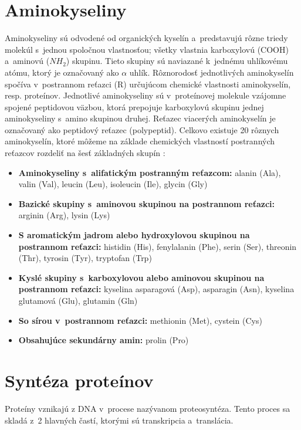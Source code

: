 \section{Aminokyseliny}
Aminokyseliny sú odvodené od organických kyselín a~predstavujú rôzne triedy molekúl s~jednou spoločnou vlastnosťou; všetky vlastnia karboxylovú (COOH) a~aminovú ($NH_{2}$) skupinu. Tieto skupiny sú naviazané k~jednému uhlíkovému atómu, ktorý je označovaný ako $\alpha$ uhlík. Rôznorodosť jednotlivých aminokyselín spočíva v~postrannom reťazci (R) určujúcom chemické vlastnosti aminokyselín, resp. proteínov. Jednotlivé aminokyseliny sú v~proteínovej molekule vzájomne spojené peptidovou väzbou, ktorá prepojuje karboxylovú skupinu jednej aminokyseliny s~amino skupinou druhej. Reťazec viacerých aminokyselín je označovaný ako peptidový reťazec (polypeptid). 
Celkovo existuje 20 rôznych aminokyselín, ktoré môžeme na základe chemických vlastností postranných reťazcov rozdeliť na šesť základných skupín \cite{aminokyseliny}:

\begin{itemize}
	\item \textbf{Aminokyseliny s~alifatickým postranným reťazcom:} alanin (Ala), valin (Val), leucin (Leu), isoleucin (Ile), glycin (Gly)
	\item \textbf{Bazické skupiny s~aminovou skupinou na postrannom reťazci:} arginin (Arg), lysin (Lys)
	\item \textbf{S aromatickým jadrom alebo hydroxylovou skupinou na postrannom reťazci:}
	histidin (His), fenylalanin (Phe), serin (Ser), threonin (Thr), tyrosin (Tyr), tryptofan (Trp)
	\item \textbf{Kyslé skupiny s~karboxylovou alebo aminovou skupinou na postrannom reťazci:} kyselina asparagová (Asp), asparagin (Asn), kyselina glutamová (Glu), glutamin (Gln)
	\item \textbf{So sírou v~postrannom reťazci:} methionin (Met), cystein (Cys)
	\item \textbf{Obsahujúce sekundárny amin:} prolin (Pro)
\end{itemize}

\section{Syntéza proteínov}

Proteíny vznikajú z DNA v~procese nazývanom proteosyntéza. Tento proces sa skladá z~2 hlavných častí, ktorými sú transkripcia a~translácia.

